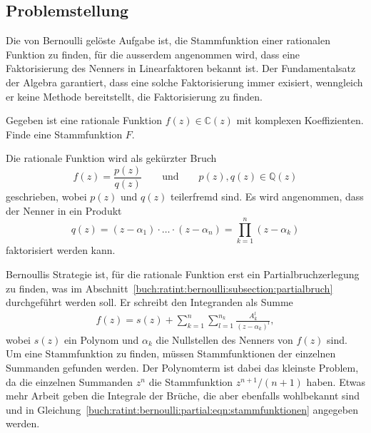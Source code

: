 %
%
%
\subsection{Problemstellung}
Die von Bernoulli gelöste Aufgabe ist, die Stammfunktion einer
rationalen Funktion zu finden, für die ausserdem angenommen wird,
dass eine Faktorisierung des Nenners in Linearfaktoren bekannt ist.
Der Fundamentalsatz der Algebra garantiert, dass eine solche
Faktorisierung immer exisiert, wenngleich er keine Methode
bereitstellt, die Faktorisierung zu finden.

\begin{aufgabe}
Gegeben ist eine rationale Funktion $f(z) \in \mathbb{C}(z)$ mit
komplexen Koeffizienten.
%
Finde eine Stammfunktion $F$.
\end{aufgabe}

Die rationale Funktion wird als gekürzter Bruch
\[
f(z)
=
\frac{p(z)}{q(z)}
\qquad\text{und}\qquad
p(z),q(z)\in \mathbb{Q}(z)
\]
geschrieben, wobei $p(z)$ und $q(z)$ teilerfremd sind.
Es wird angenommen, dass der Nenner in ein Produkt
\[
q(z)
=
(z-\alpha_1)\cdot\ldots\cdot (z-\alpha_n)
=
\prod_{k=1}^n (z-\alpha_k)
\]
faktorisiert werden kann.

Bernoullis Strategie ist, für die rationale Funktion erst
ein Partialbruchzerlegung zu finden, was im
Abschnitt~\ref{buch:ratint:bernoulli:subsection:partialbruch}
durchgeführt werden soll.
Er schreibt den Integranden als Summe
\begin{align*}
f(z)
=
s(z)
+
\sum_{k=1}^n\sum_{l=1}^{n_k}\frac{A_k^l}{(z-\alpha_k)^l},
\end{align*}
wobei $s(z)$ ein Polynom und $\alpha_k$ die Nullstellen
des Nenners von $f(z)$ sind. 
Um eine Stammfunktion zu finden, müssen Stammfunktionen der
einzelnen Summanden gefunden werden.
Der Polynomterm ist dabei das kleinste Problem, da die einzelnen
Summanden $z^n$ die Stammfunktion $z^{n+1}/(n+1)$ haben.
Etwas mehr Arbeit geben die Integrale der Brüche, die aber ebenfalls
wohlbekannt sind und in
Gleichung~\eqref{buch:ratint:bernoulli:partial:eqn:stammfunktionen}
angegeben werden.

